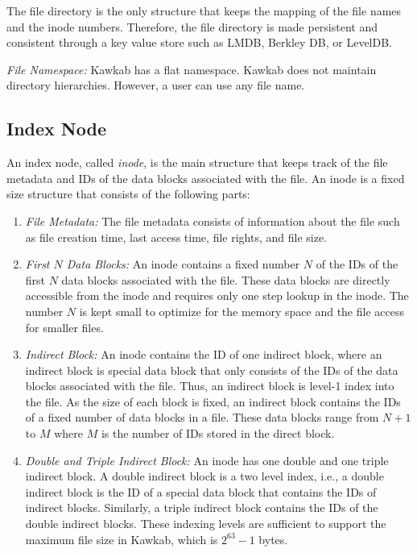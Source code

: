 \documentclass[]{article}
\newcommand{\subtopic}[1]{\vspace{1.5pt} \noindent \textit{#1}}
\begin{document}
The file directory is the only structure that keeps the mapping of the file
names and the inode numbers. Therefore, the file directory is made persistent
and consistent through a key value store such as LMDB, Berkley DB, or LevelDB.

\subtopic{File Namespace:} Kawkab has a flat namespace. Kawkab does not maintain
directory hierarchies. However, a user can use any file name.



\subsection{Index Node} An index node, called \textit{inode}, is the main
structure that keeps track of the file metadata and IDs of the data
blocks associated with the file. An inode is a fixed size structure that
consists of the following parts:

\begin{enumerate}
  \item \subtopic{File Metadata:} The file metadata consists of information
        about the file such as file creation time, last access time, file
        rights, and file size.

	\item \subtopic{First $N$ Data Blocks:} An inode contains a fixed number
$N$ of the IDs of the first $N$ data blocks associated with the file.
These data blocks are directly accessible from the inode and requires
only one step lookup in the inode.
The number $N$ is kept small to optimize for the memory space and the file
access for smaller files. 

  \item \subtopic{Indirect Block:} 
An inode contains the ID of one indirect block, where an indirect block is
special data block that only consists of the IDs of the data blocks associated
with the file. Thus, an indirect block is level-1 index into the file.
As the size of each block is fixed, an indirect block contains the
IDs of a fixed number of data blocks in a file. These data blocks 
range from $N+1$ to $M$ where $M$ is the number of IDs stored in the
direct block.

  \item \subtopic{Double and Triple Indirect Block:}
An inode has one double and one triple indirect block. A double indirect block is a two
level index, i.e., a double indirect block is the ID of a special data block that contains
the IDs of indirect blocks. Similarly, a triple indirect block contains the IDs of the
double indirect blocks. These indexing levels are sufficient to support the maximum 
file size in Kawkab, which is $2^{63}-1$ bytes.

\end{enumerate}
\end{document}
